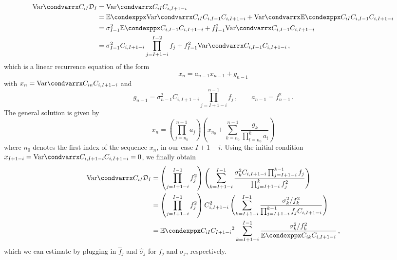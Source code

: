\documentclass[a4paper]{book}
\begin{document}
\begin{align}
  \condvarr{C_{iI}}{\mathcal{D}_I} &= \condvarr{C_{iI}}{C_{i, I + 1 - i}} \\
  &= \condexpp{\condvarr{C_{iI}}{C_{i, I - 1}}}{C_{i, I + 1 - i}} + \condvarr{\condexpp{C_{iI}}{C_{i, I - 1}}}{C_{i, I + 1 - i}} \\
  &= \sigma^2_{I - 1} \condexpp{C_{i, I - 1}}{C_{i, I + 1 - i}} + f^2_{I - 1} \condvarr{C_{i, I - 1}}{C_{i, I + 1 - i}} \\
  &= \sigma^2_{I - 1} C_{i, I + 1 - i} \prod_{j = I + 1 - i}^{I - 2} f_j + f^2_{I - 1} \condvarr{C_{i, I - 1}}{C_{i, I + 1 - i}} \,,
\end{align}
which is a linear recurrence equation of the form
\begin{equation}
  x_n = a_{n - 1} x_{n - 1} + g_{n - 1}
\end{equation}
with $x_n = \condvarr{C_{in}}{C_{i, I + 1 - i}}$ and
\begin{equation}
  g_{n - 1} = \sigma^2_{n - 1} C_{i, I + 1 - i} \prod_{j = I + 1 - i}^{n - 1} f_j \,, \qquad a_{n - 1} = f^2_{n - 1} \,. 
\end{equation}
The general solution is given by
\begin{equation}
  x_n = \left( \prod_{j = n_0}^{n - 1} a_j \right) \left( x_{n_0} + \sum_{k = n_0}^{n - 1} \frac{g_k}{\prod_{l = n_0}^k a_l} \right)
\end{equation}
where $n_0$ denotes the first index of the sequence $x_n$, in our case $I + 1 - i$. Using the initial condition $x_{I + 1 - i} = \condvarr{C_{i, I + 1 - i}}{C_{i, I + 1 - i}} = 0$, we finally obtain
\begin{align}
  \condvarr{C_{iI}}{\mathcal{D}_I} 
  &= \left( \prod_{j = I + 1 - i}^{I - 1} f^2_j \right) \left( \sum_{k = I + 1 - i}^{I - 1} \frac{\sigma^2_k C_{i, I + 1 - i} \prod_{j = I + 1 - i}^{k - 1} f_j}{\prod_{j = I + 1 - i}^k f^2_j} \right) \\
  &= \left( \prod_{j = I + 1 - i}^{I - 1} f^2_j \right) C^2_{i, I + 1 - i} \left( \sum_{k = I + 1 - i}^{I - 1} \frac{\sigma^2_k / f^2_k}{\prod_{j = I + 1 - i}^{k - 1} f_j C_{i, I + 1 - i}} \right) \\
  &= \condexpp{C_{iI}}{C_{I + 1 - i}}^2 \sum_{k = I + 1 - i}^{I - 1} \frac{\sigma^2_k / f^2_k}{\condexpp{C_{ik}}{C_{i, I + 1 - i}}} \,,
\end{align}
which we can estimate by plugging in $\widehat{f}_j$ and $\widehat{\sigma}_j$ for $f_j$ and $\sigma_j$, respectively. 
\end{document}
